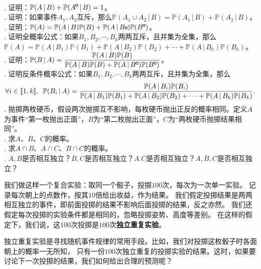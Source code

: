 \documentclass[12pt,UTF8]{ctexbook}
\begin{document}
\begin{xt}
    \mbox{} \\
    . 证明：$\mathbb{P}(A \, | \, B) + \mathbb{P}(A^{\bu} \, | \, B) = 1$。 \\
    . 证明：如果事件$A_1,A_2$互斥，那么$\mathbb{P}(A_1 \cup A_2\, | \, B) = \mathbb{P}(A_1 \, | \, B) + \mathbb{P}(A_2 \, | \, B)$。 \\
    . 证明：$\mathbb{P}(A) = \mathbb{P}(A \, | \, B) \mathbb{P}(B) + \mathbb{P}(A \, | \, B{\bu}) \mathbb{P}(B^{\bu})$。 \\
    . 证明全概率公式：如果$B_1, B_2, \cdots, B_k$两两互斥，且并集为全集，那么$\mathbb{P}(A) = \mathbb{P}(A \, | \, B_1) \mathbb{P}(B_1) + \mathbb{P}(A \, | \, B_2) \mathbb{P}(B_2) + \cdots + \mathbb{P}(A \, | \, B_k) \mathbb{P}(B_k)$。 \\
    . 证明：$\displaystyle\mathbb{P}(B \, | \, A) = \frac{\mathbb{P}(A \, | \, B) \mathbb{P}(B)}{\mathbb{P}(A \, | \, B) \mathbb{P}(B) + \mathbb{P}(A \, | \, B^{\bu}) \mathbb{P}(B^{\bu})}$。 \\
    . 证明反条件概率公式：如果$B_1, B_2, \cdots, B_k$两两互斥，且并集为全集，那么
    $$\forall i\in[\![1,k]\!], \,\,\, \mathbb{P}(B_i \, | \, A) = \frac{\mathbb{P}(A \, | \, B_i) \mathbb{P}(B_i)}{\mathbb{P}(A \, | \, B_1) \mathbb{P}(B_1) + \mathbb{P}(A \, | \, B_2) \mathbb{P}(B_2) + \cdots + \mathbb{P}(A \, | \, B_k) \mathbb{P}(B_k)}.$$ 
    . 抛掷两枚硬币，假设两次抛掷互不影响，每枚硬币抛出正反的概率相同。定义$A$为事件“第一枚抛出正面”，$B$为“第二枚抛出正面”，$C$为“两枚硬币抛掷结果相同”。 \\
    . 求$A$、$B$、$C$的概率。\\
    . 求$A\cap B$、$A\cap C$、$B \cap C$的概率。\\
    . $A,B$是否相互独立？$B,C$是否相互独立？$A.C$是否相互独立？$A,B,C$是否相互独立？
\end{xt}


我们做这样一个复合实验：取同一个骰子，投掷$100$次，每次为一次单一实验。
记录每次朝上的点数作，按其$10$倍给出收益，作为结果。
我们假定投掷结果是两两相互独立的事件，即前面投掷的结果不影响后面投掷的结果，反之亦然。
我们还假定每次投掷的实验条件都是相同的，忽略投掷姿势、高度等差别。
在这样的假定下，我们说，这$100$次投掷是$100$次\textbf{独立重复实验}。

独立重复实验是寻找随机事件规律的常用手段。比如，我们对投掷这枚骰子时各面朝上的概率一无所知，
只有一份$100$次独立重复的投掷实验的结果。这时，如果要讨论下一次投掷的结果，我们如何给出合理的预测呢？
\end{document}
